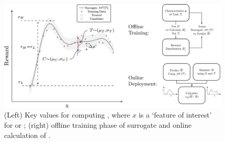     
       \begin{figure}[tb]
        \centering
        \includegraphics[width=0.79\linewidth]{Figures/SQ_AllCombined.png}
        \caption{(Left) Key values for computing \xQ, where $x$ is a `feature of interest' for \task or \solve; (right) offline training phase of surrogate \surrogate{} and online calculation of \xQ{}. }
        \label{fig:sq_v3}
        \vspace{-0.2cm}
    \end{figure}
    
    
    
